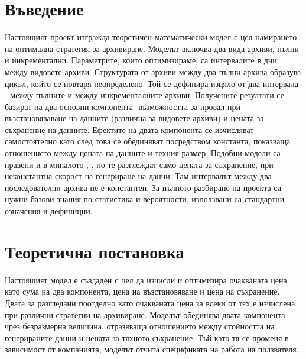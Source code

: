 \documentclass[11pt, a4paper]{article}
\theoremstyle{definition}
\begin{document}
\section{Въведение}
		Настоящият проект изгражда теоретичен математически модел с цел намирането на оптимална стратегия за архивиране. Моделът включва два вида архиви, пълни и инкрементални. Параметрите, които оптимизираме, са интервалите в дни между видовете архиви. Структурата от архиви между два пълни архива образува цикъл, който се повтаря неопределено. Той се дефинира изцяло от два интервала - между пълните и между инкременталните архиви. Получените резултати се базират на два основни компонента- възможността за провал при възстановяваване на данните (различна за видовете архиви) и цената за съхранение на данните. Ефектите на двата компонента се изчисляват самостоятелно като след това се обединяват посредством константа, показваща отношението между цената на данните и техния размер. Подобни модели са правени и в миналото \cite{qian2010optimal}, \cite{nakamura2003optimal}, но те разглеждат само цената за съхранение, при неконстантна скорост на генериране на данни. Там интервалът между два последователни архива не е константен. За пълното разбиране на проекта са нужни базови знания по статистика и вероятности, използвани са стандартни означения и дефиниции.\newpage

\section{Теоретична постановка}
	Настоящият модел е създаден с цел да изчисли и оптимизира очакваната цена като сума на два компонента, цена на възстановяване и цена на съхранение. Двата за разгледани поотделно като очакваната цена за всеки от тях е изчислена при различни стратегии на архивиране. Моделът обединява двата компонента чрез безразмерна величина, отразяваща отношението между стойността на генерираните данни и цената за тяхното съхранение. Тъй като тя се променя в зависимост от компанията, моделът отчита спецификата на работа на ползвателя.
\end{document}
